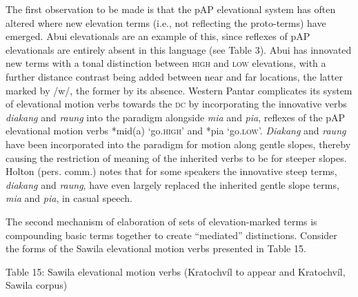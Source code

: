 The first observation to be made is that the pAP elevational system has often altered where new elevation terms (i.e., not reflecting the proto-terms) have emerged. Abui elevationals are an example of this, since reflexes of pAP elevationals are entirely absent in this language (see Table 3). Abui has innovated new terms with a tonal distinction between \textsc{high} and \textsc{low} elevations, with a further distance contrast being added between near and far locations, the latter marked by /w/, the former by its absence. Western Pantar complicates its system of elevational motion verbs towards the \textsc{dc} by incorporating the innovative verbs \textit{diakang} and \textit{raung} into the paradigm alongside \textit{mia} and \textit{pia}, reflexes of the pAP elevational motion verbs *mid(a) {\textquoteleft}go.\textsc{high{\textquoteright}} and *pia {\textquoteleft}go.\textsc{low{\textquoteright}. }\textit{Diakang} and \textit{raung}\textsc{ }have been incorporated into the paradigm for motion along gentle 
slopes, thereby causing the restriction of meaning of the inherited verbs to be for steeper slopes. Holton (pers. comm.) notes that for some speakers the innovative steep terms, \textit{diakang} and \textit{raung}, have even largely replaced the inherited gentle slope terms, \textit{mia} and \textit{pia}, in casual speech. 

The second mechanism of elaboration of sets of elevation-marked terms is compounding basic terms together to create {\textquotedblleft}mediated{\textquotedblright} distinctions. Consider the forms of the Sawila elevational motion verbs presented in Table 15. 

{\centering
Table 15: Sawila elevational motion verbs (Kratochv\'il to appear and Kratochv\'il, Sawila corpus)
\par}

